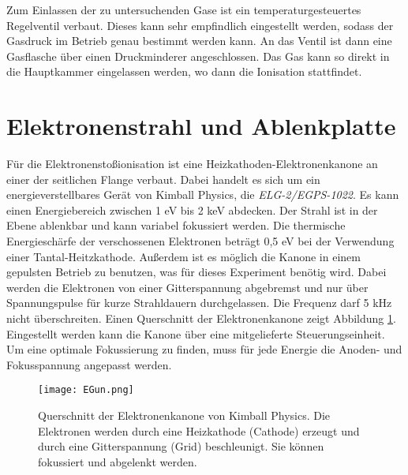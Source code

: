 Zum Einlassen der zu untersuchenden Gase ist ein temperaturgesteuertes Regelventil verbaut. Dieses kann sehr empfindlich eingestellt werden, sodass der Gasdruck im Betrieb genau bestimmt werden kann. An das Ventil ist dann eine Gasflasche über einen Druckminderer angeschlossen. Das Gas kann so direkt in die Hauptkammer eingelassen werden, wo dann die Ionisation stattfindet.

\section{Elektronenstrahl und Ablenkplatte}
Für die Elektronenstoßionisation ist eine Heizkathoden-Elektronenkanone an einer der seitlichen Flange verbaut. Dabei handelt es sich um ein energieverstellbares Gerät von Kimball Physics, die \textit{ELG-2/EGPS-1022}. Es kann einen Energiebereich zwischen 1 eV bis 2 keV abdecken. Der Strahl ist in der Ebene ablenkbar und kann variabel fokussiert werden. Die thermische Energieschärfe der verschossenen Elektronen beträgt 0,5 eV bei der Verwendung einer Tantal-Heitzkathode. Außerdem ist es möglich die Kanone in einem gepulsten Betrieb zu benutzen, was für dieses Experiment benötig wird. Dabei werden die Elektronen von einer Gitterspannung abgebremst und nur über Spannungspulse für kurze Strahldauern durchgelassen. Die Frequenz darf 5 kHz nicht überschreiten. Einen Querschnitt der Elektronenkanone zeigt Abbildung \ref{fig:EGun}. Eingestellt werden kann die Kanone über eine mitgelieferte Steuerungseinheit. Um eine optimale Fokussierung zu finden, muss für jede Energie die Anoden- und Fokusspannung angepasst werden.

\begin{figure}
    \centering
    \texttt{[image: EGun.png]}
    \caption[Querschnitt der Elektronenkanone]{Querschnitt der Elektronenkanone von Kimball Physics. Die Elektronen werden durch eine Heizkathode (Cathode) erzeugt und durch eine Gitterspannung (Grid) beschleunigt. Sie können fokussiert und abgelenkt werden.}
    \label{fig:EGun}
\end{figure}

